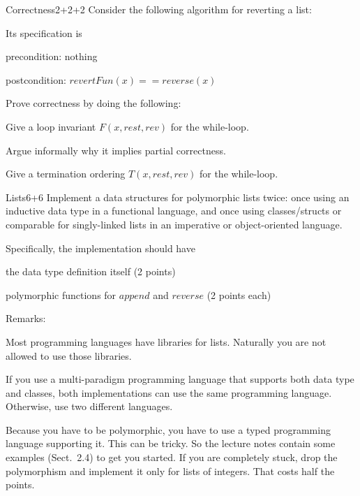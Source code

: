 \documentclass[a4paper]{article}
\begin{document}
\header

\begin{problem}{Correctness}{2+2+2}
Consider the following algorithm for reverting a list:
\begin{acode}
\end{acode}

Its specification is
\begin{compactitem}
 \item precondition: nothing
 \item postcondition: $revertFun(x)==reverse(x)$
\end{compactitem}

Prove correctness by doing the following:
\begin{compactenum}
 \item Give a loop invariant $F(x,rest,rev)$ for the while-loop.
 \item Argue informally why it implies partial correctness. 
 \item Give a termination ordering $T(x,rest,rev)$ for the while-loop.
\end{compactenum}
\end{problem}

\begin{problem}{Lists}{6+6}
Implement a data structures for polymorphic lists twice: once using an inductive data type in a functional language, and once using classes/structs or comparable for singly-linked lists in an imperative or object-oriented language.

Specifically, the implementation should have
\begin{compactitem}
 \item the data type definition itself (2 points)
 \item polymorphic functions for $append$ and $reverse$ (2 points each)
\end{compactitem}

Remarks:
\begin{compactitem}
\item Most programming languages have libraries for lists.
Naturally you are not allowed to use those libraries.
\item If you use a multi-paradigm programming language that supports both data type and classes, both implementations can use the same programming language.
Otherwise, use two different languages.
\item Because you have to be polymorphic, you have to use a typed programming language supporting it.
This can be tricky. So the lecture notes contain some examples (Sect.~2.4) to get you started.
If you are completely stuck, drop the polymorphism and implement it only for lists of integers.
That costs half the points.
\end{compactitem}
\end{problem}
\end{document}
